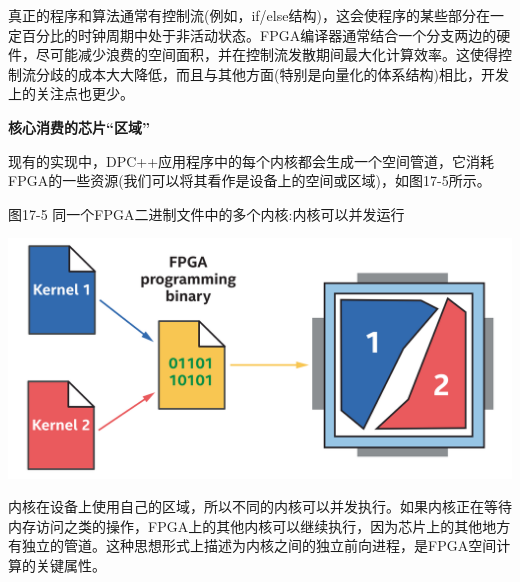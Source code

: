真正的程序和算法通常有控制流(例如，if/else结构)，这会使程序的某些部分在一定百分比的时钟周期中处于非活动状态。FPGA编译器通常结合一个分支两边的硬件，尽可能减少浪费的空间面积，并在控制流发散期间最大化计算效率。这使得控制流分歧的成本大大降低，而且与其他方面(特别是向量化的体系结构)相比，开发上的关注点也更少。\par

\hspace*{\fill} \par %
\textbf{核心消费的芯片“区域”}

现有的实现中，DPC++应用程序中的每个内核都会生成一个空间管道，它消耗FPGA的一些资源(我们可以将其看作是设备上的空间或区域)，如图17-5所示。\par

\hspace*{\fill} \par %
图17-5 同一个FPGA二进制文件中的多个内核:内核可以并发运行
\begin{center}
	\includegraphics[width=1.0\textwidth]{content/chapter-17/images/6}
\end{center}

内核在设备上使用自己的区域，所以不同的内核可以并发执行。如果内核正在等待内存访问之类的操作，FPGA上的其他内核可以继续执行，因为芯片上的其他地方有独立的管道。这种思想形式上描述为内核之间的独立前向进程，是FPGA空间计算的关键属性。\par







